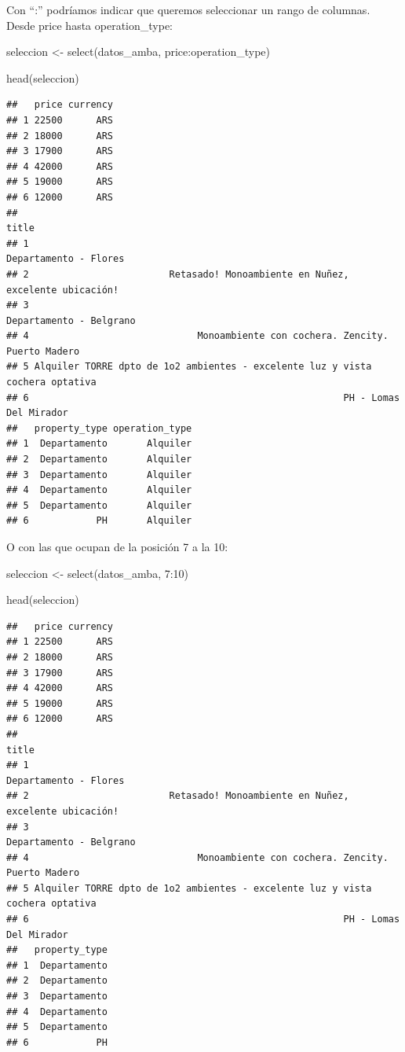 \documentclass[
  spanish,
]{book}
\newenvironment{Shaded}{\begin{snugshade}}{\end{snugshade}}
\newcommand{\DecValTok}[1]{\textcolor[rgb]{0.00,0.00,0.81}{#1}}
\newcommand{\FunctionTok}[1]{\textcolor[rgb]{0.00,0.00,0.00}{#1}}
\newcommand{\NormalTok}[1]{#1}
\newcommand{\OtherTok}[1]{\textcolor[rgb]{0.56,0.35,0.01}{#1}}
\newcommand{\SpecialCharTok}[1]{\textcolor[rgb]{0.00,0.00,0.00}{#1}}
\begin{document}
Con ``:'' podríamos indicar que queremos seleccionar un rango de columnas. Desde price hasta operation\_type:

\begin{Shaded}
\begin{Highlighting}[]
\NormalTok{seleccion }\OtherTok{\textless{}{-}} \FunctionTok{select}\NormalTok{(datos\_amba, price}\SpecialCharTok{:}\NormalTok{operation\_type)}

\FunctionTok{head}\NormalTok{(seleccion)}
\end{Highlighting}
\end{Shaded}

\begin{verbatim}
##   price currency
## 1 22500      ARS
## 2 18000      ARS
## 3 17900      ARS
## 4 42000      ARS
## 5 19000      ARS
## 6 12000      ARS
##                                                                           title
## 1                                                         Departamento - Flores
## 2                         Retasado! Monoambiente en Nuñez, excelente ubicación!
## 3                                                       Departamento - Belgrano
## 4                              Monoambiente con cochera. Zencity. Puerto Madero
## 5 Alquiler TORRE dpto de 1o2 ambientes - excelente luz y vista cochera optativa
## 6                                                        PH - Lomas Del Mirador
##   property_type operation_type
## 1  Departamento       Alquiler
## 2  Departamento       Alquiler
## 3  Departamento       Alquiler
## 4  Departamento       Alquiler
## 5  Departamento       Alquiler
## 6            PH       Alquiler
\end{verbatim}

O con las que ocupan de la posición 7 a la 10:

\begin{Shaded}
\begin{Highlighting}[]
\NormalTok{seleccion }\OtherTok{\textless{}{-}} \FunctionTok{select}\NormalTok{(datos\_amba, }\DecValTok{7}\SpecialCharTok{:}\DecValTok{10}\NormalTok{)}

\FunctionTok{head}\NormalTok{(seleccion)}
\end{Highlighting}
\end{Shaded}

\begin{verbatim}
##   price currency
## 1 22500      ARS
## 2 18000      ARS
## 3 17900      ARS
## 4 42000      ARS
## 5 19000      ARS
## 6 12000      ARS
##                                                                           title
## 1                                                         Departamento - Flores
## 2                         Retasado! Monoambiente en Nuñez, excelente ubicación!
## 3                                                       Departamento - Belgrano
## 4                              Monoambiente con cochera. Zencity. Puerto Madero
## 5 Alquiler TORRE dpto de 1o2 ambientes - excelente luz y vista cochera optativa
## 6                                                        PH - Lomas Del Mirador
##   property_type
## 1  Departamento
## 2  Departamento
## 3  Departamento
## 4  Departamento
## 5  Departamento
## 6            PH
\end{verbatim}
\end{document}
